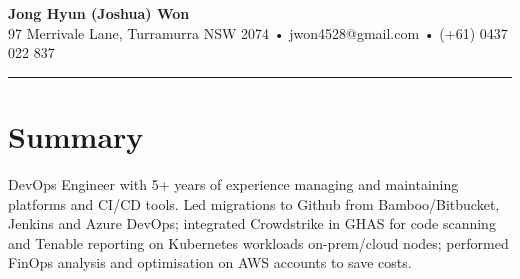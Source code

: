\documentclass[11pt,letterpaper]{article}
\begin{document}
\newcommand{\SubItem}[1]{
    {\setlength\itemindent{15pt} \item[-] #1}
}

\begin{center}
{\fontsize{24}{28}\selectfont\bfseries\color{headercolor} Jong Hyun (Joshua) Won}\\[0.5em]
97 Merrivale Lane, Turramurra NSW 2074 • jwon4528@gmail.com • (+61) 0437 022 837
\end{center}
\noindent\rule{\textwidth}{2pt}
\section*{Summary}
DevOps Engineer with 5+ years of experience managing and maintaining platforms and CI/CD tools. Led migrations to Github from Bamboo/Bitbucket, Jenkins and Azure DevOps; integrated Crowdstrike in GHAS for code scanning and Tenable reporting on Kubernetes workloads on-prem/cloud nodes; performed FinOps analysis and optimisation on AWS accounts to save costs.
\end{document}
